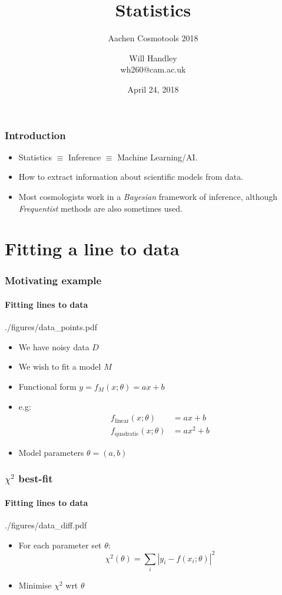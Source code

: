 \documentclass[%
]{beamer}
\title{Statistics}
\subtitle{Aachen Cosmotools 2018}
\author[Handley] %
{Will Handley\\ \small{wh260@cam.ac.uk}}
\institute[University of Cambridge] %
{%
Astrophysics Group \\
Cavendish Laboratory \\
University of Cambridge
}
\date{April 24, 2018}
\begin{document}
\begin{frame}
  \titlepage
\end{frame}


\begin{frame}
    \frametitle{Introduction}
    \begin{itemize}
        \item Statistics $\equiv$ Inference $\equiv$ Machine Learning/AI.
        \item How to extract information about scientific models from data.
        \item Most cosmologists work in a {\em Bayesian\/} framework of inference, although {\em Frequentist\/} methods are also sometimes used.
    \end{itemize}
\end{frame}

\section{Fitting a line to data}
\begin{frame}
    \frametitle{Motivating example}
    \framesubtitle{Fitting lines to data}
    \begin{figright}[0.4]{./figures/data_points.pdf}
        \begin{itemize}
            \item We have noisy data $D$
            \item We wish to fit a model $M$
            \item Functional form $y=f_M(x;\theta)=a x + b$
            \item e.g:
                \begin{align}
                     f_\text{linear}(x;\theta)&=a x + b       \nonumber\\
                     f_\text{quadratic}(x;\theta)&=a x^2 + b  \nonumber
                \end{align}
            \item Model parameters $\theta= (a,b)$
        \end{itemize}
    \end{figright}
\end{frame}

\begin{frame}
    \frametitle{$\chi^2$ best-fit}
    \framesubtitle{Fitting lines to data}
    \begin{figright}[0.4]{./figures/data_diff.pdf}
        \begin{itemize}
            \item For each parameter set $\theta$:
                \[
                    \chi^2(\theta) = \sum_i \left|y_i - f(x_i;\theta)\right|^2
                \]
            \item Minimise $\chi^2$ wrt $\theta$
        \end{itemize}
    \end{figright}
\end{frame}
\end{document}
